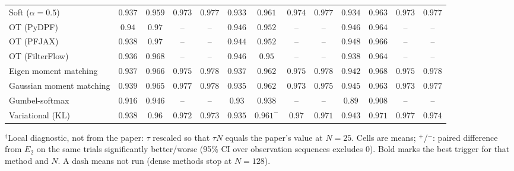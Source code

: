 \begin{table}[ht]
\begin{adjustbox}{max width=\linewidth}
\begin{tabular}{lcccc|cccc|cccc}
Soft ($\alpha{=}0.5$) & $\mathbf{0.937}$ & $\mathbf{0.959}$ & $\mathbf{0.973}$ & $\mathbf{0.977}$ & $0.933$ & $0.961$ & $0.974$ & $0.977$ & $0.934$ & $0.963$ & $0.973$ & $\mathbf{0.977}$ \\
OT (PyDPF) & $0.94$ & $0.97$ & -- & -- & $\mathbf{0.946}$ & $\mathbf{0.952}$ & -- & -- & $\mathbf{0.946}$ & $0.964$ & -- & -- \\
OT (PFJAX) & $0.938$ & $0.97$ & -- & -- & $0.944$ & $\mathbf{0.952}$ & -- & -- & $\mathbf{0.948}$ & $0.966$ & -- & -- \\
OT (FilterFlow) & $0.936$ & $0.968$ & -- & -- & $\mathbf{0.946}$ & $\mathbf{0.95}$ & -- & -- & $0.938$ & $0.964$ & -- & -- \\
Eigen moment matching & $0.937$ & $0.966$ & $0.975$ & $0.978$ & $0.937$ & $\mathbf{0.962}$ & $\mathbf{0.975}$ & $\mathbf{0.978}$ & $\mathbf{0.942}$ & $0.968$ & $0.975$ & $0.978$ \\
Gaussian moment matching & $0.939$ & $0.965$ & $0.977$ & $0.978$ & $0.935$ & $\mathbf{0.962}$ & $0.973$ & $\mathbf{0.975}$ & $\mathbf{0.945}$ & $0.963$ & $\mathbf{0.973}$ & $0.977$ \\
Gumbel-softmax & $0.916$ & $\mathbf{0.946}$ & -- & -- & $\mathbf{0.93}$ & $0.938$ & -- & -- & $0.89$ & $0.908$ & -- & -- \\
Variational (KL) & $0.938$ & $\mathbf{0.96}$ & $0.972$ & $0.973$ & $0.935$ & $0.961^{-}$ & $\mathbf{0.97}$ & $\mathbf{0.971}$ & $\mathbf{0.943}$ & $0.971$ & $0.977$ & $0.974$ \\
\bottomrule
\end{tabular}
\end{adjustbox}
\par\smallskip\parbox{0.95\linewidth}{\footnotesize $^\dagger$Local diagnostic, not from the paper: $\tau$ rescaled so that $\tau N$ equals the paper's value at $N{=}25$. Cells are means; $^{+}$/$^{-}$: paired difference from $E_2$ on the same trials significantly better/worse (95\% CI over observation sequences excludes 0). Bold marks the best trigger for that method and $N$. A dash means not run (dense methods stop at $N{=}128$).}
\end{table}

